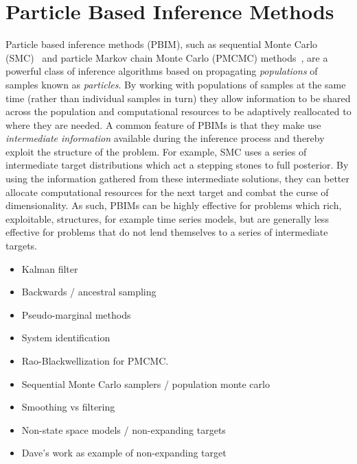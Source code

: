 
\chapter{Particle Based Inference Methods}
\label{sec:part}

Particle based inference methods (PBIM), such as sequential Monte Carlo (SMC)~\citep{gordon1993novel,doucet2001introduction} and 
particle Markov chain Monte Carlo (PMCMC) methods~\citep{andrieu2009pseudo,rainforth2016interacting},
are a powerful class of inference algorithms based on propagating \emph{populations} of samples
known as \emph{particles}.  By working with populations of samples at the same time (rather than individual
samples in turn) they allow information to be shared across the population and computational
resources to be adaptively reallocated to where they are needed.  A common feature of PBIMs is
that they make use \emph{intermediate information} available during the inference process and thereby
exploit the structure of the problem.  For example, SMC uses a series of intermediate target distributions
which act a stepping stones to full posterior.  By using the information gathered from these intermediate
solutions, they can better allocate computational resources for the next target and combat the curse of
dimensionality.  As such, PBIMs can be highly effective for problems which rich, exploitable, structures, 
for example time series models, but are generally less effective for problems that do not lend themselves
to a series of intermediate targets.




\begin{itemize}
	\item Kalman filter
	\item Backwards / ancestral sampling
	\item Pseudo-marginal methods
	\item System identification
	\item Rao-Blackwellization for PMCMC.
	\item Sequential Monte Carlo samplers / population monte carlo
	\item Smoothing vs filtering
	\item Non-state space models / non-expanding targets
	\item Dave's work as example of non-expanding target
\end{itemize}